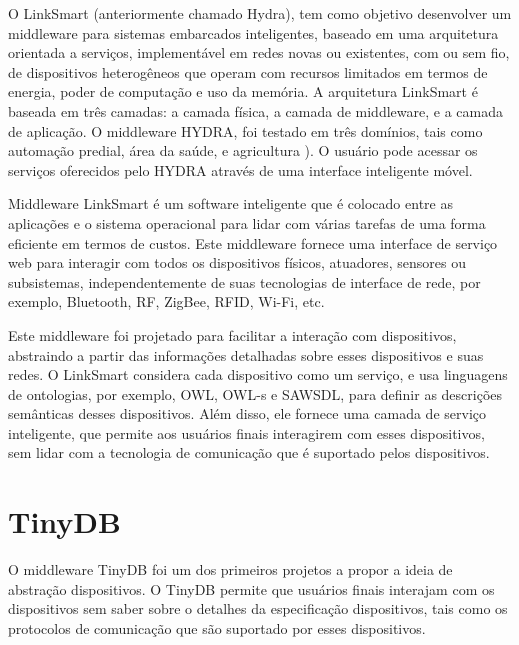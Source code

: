 O LinkSmart (anteriormente chamado Hydra), tem como objetivo desenvolver
um middleware para sistemas embarcados inteligentes, baseado em uma
arquitetura orientada a serviços, implementável em redes novas ou
existentes, com ou sem fio, de dispositivos heterogêneos que operam
com recursos limitados em termos de energia, poder de computação e
uso da memória\cite{sarnovsky2007hydra}. A arquitetura LinkSmart
é baseada em três camadas: a camada física, a camada de middleware,
e a camada de aplicação. O middleware HYDRA, foi testado em três domínios,
tais como automação predial, área da saúde, e agricultura \cite{jahn2010energy}).
O usuário pode acessar os serviços oferecidos pelo HYDRA através de
uma interface inteligente móvel.

Middleware LinkSmart é um software inteligente que é colocado entre
as aplicações e o sistema operacional para lidar com várias tarefas
de uma forma eficiente em termos de custos. Este middleware fornece
uma interface de serviço web para interagir com todos os dispositivos
físicos, atuadores, sensores ou subsistemas, independentemente de
suas tecnologias de interface de rede, por exemplo, Bluetooth, RF,
ZigBee, RFID, Wi-Fi, etc.

Este middleware foi projetado para facilitar a interação com dispositivos,
abstraindo a partir das informações detalhadas sobre esses dispositivos
e suas redes. O LinkSmart considera cada dispositivo como um serviço,
e usa linguagens de ontologias, por exemplo, OWL, OWL-s e SAWSDL,
para definir as descrições semânticas desses dispositivos. Além disso,
ele fornece uma camada de serviço inteligente, que permite aos usuários
finais interagirem com esses dispositivos, sem lidar com a tecnologia
de comunicação que é suportado pelos dispositivos.


\section{TinyDB}

O middleware TinyDB\cite{madden2005tinydb} foi um dos primeiros projetos
a propor a ideia de abstração dispositivos. O TinyDB permite que usuários
finais interajam com os dispositivos sem saber sobre o detalhes da
especificação dispositivos, tais como os protocolos de comunicação
que são suportado por esses dispositivos.

